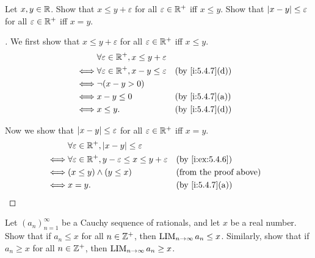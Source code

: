 \begin{ex}\label{i:ex:5.4.7}
  Let \(x, y \in \mathbb{R}\).
  Show that \(x \leq y + \varepsilon\) for all \(\varepsilon \in \mathbb{R}^+\) iff \(x \leq y\).
  Show that \(\left\lvert x - y\right\rvert \leq \varepsilon\) for all \(\varepsilon \in \mathbb{R}^+\) iff \(x = y\).
\end{ex}

\begin{proof}[]
  We first show that \(x \leq y + \varepsilon\) for all \(\varepsilon \in \mathbb{R}^+\) iff \(x \leq y\).
  \begin{align*}
         & \forall \varepsilon \in \R^+, x \leq y + \varepsilon                      \\
    \iff & \forall \varepsilon \in \R^+, x - y \leq \varepsilon &  & \by{i:5.4.7}[d] \\
    \iff & \lnot (x - y > 0)                                                         \\
    \iff & x - y \leq 0                                         &  & \by{i:5.4.7}[a] \\
    \iff & x \leq y.                                            &  & \by{i:5.4.7}[d]
  \end{align*}

  Now we show that \(\left\lvert x - y\right\rvert \leq \varepsilon\) for all \(\varepsilon \in \mathbb{R}^+\) iff \(x = y\).
  \begin{align*}
         & \forall \varepsilon \in \R^+, \abs{x - y} \leq \varepsilon                                                   \\
    \iff & \forall \varepsilon \in \R^+, y - \varepsilon \leq x \leq y + \varepsilon &  & \by{i:ex:5.4.6}               \\
    \iff & (x \leq y) \land (y \leq x)                                               &  & \text{(from the proof above)} \\
    \iff & x = y.                                                                    &  & \by{i:5.4.7}[a]
  \end{align*}
\end{proof}

\begin{ex}\label{i:ex:5.4.8}
  Let \((a_n)_{n = 1}^{\infty}\) be a Cauchy sequence of rationals, and let \(x\) be a real number.
  Show that if \(a_n \leq x\) for all \(n \in \mathbb{Z}^+\), then \(\operatorname*{LIM}_{n \to \infty} a_n \leq x\).
  Similarly, show that if \(a_n \geq x\) for all \(n \in \mathbb{Z}^+\), then \(\operatorname*{LIM}_{n \to \infty} a_n \geq x\).
\end{ex}

